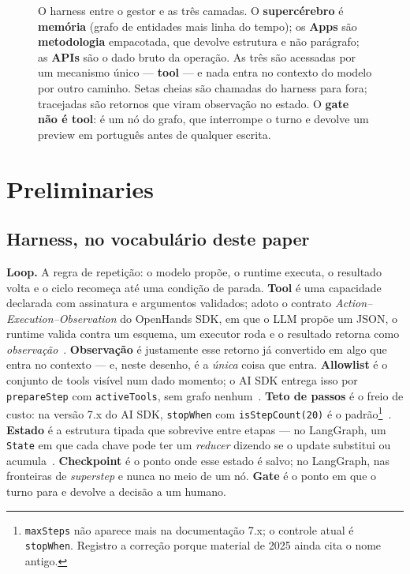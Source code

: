 \documentclass[10pt,twocolumn]{article}
\newcommand{\code}[1]{\texttt{\footnotesize #1}}
\begin{document}
\begin{figure}[t]
{}
\caption{O harness entre o gestor e as três camadas. O \textbf{supercérebro} é
\textbf{memória} (grafo de entidades mais linha do tempo); os \textbf{Apps} são
\textbf{metodologia} empacotada, que devolve estrutura e não parágrafo; as \textbf{APIs} são
o dado bruto da operação. As três são acessadas por um mecanismo único --- \textbf{tool} ---
e nada entra no contexto do modelo por outro caminho. Setas cheias são chamadas do harness
para fora; tracejadas são retornos que viram observação no estado. O \textbf{gate não é
tool}: é um nó do grafo, que interrompe o turno e devolve um preview em português antes de
qualquer escrita.}
\label{fig:sistema}
\end{figure}

\section{Preliminaries}

\subsection{Harness, no vocabulário deste paper}

\textbf{Loop.} A regra de repetição: o modelo propõe, o runtime executa, o resultado
volta e o ciclo recomeça até uma condição de parada. \textbf{Tool} é uma capacidade
declarada com assinatura e argumentos validados; adoto o contrato
\emph{Action--Execution--Observation} do OpenHands SDK, em que o LLM propõe um JSON, o
runtime valida contra um esquema, um executor roda e o resultado retorna como
\emph{observação}~\cite{wang2026openhands}. \textbf{Observação} é justamente esse retorno já
convertido em algo que entra no contexto --- e, neste desenho, é a \emph{única} coisa que
entra. \textbf{Allowlist} é o conjunto de tools visível num dado momento; o AI SDK entrega
isso por \code{prepareStep} com \code{activeTools}, sem grafo
nenhum~\cite{vercel2026loopcontrol}. \textbf{Teto de passos} é o freio de custo: na versão
7.x do AI SDK, \code{stopWhen} com \code{isStepCount(20)} é o
padrão\footnote{\code{maxSteps} não aparece mais na documentação 7.x; o controle atual é
\code{stopWhen}. Registro a correção porque material de 2025 ainda cita o nome
antigo.}~\cite{vercel2026loopcontrol}. \textbf{Estado} é a estrutura tipada que sobrevive
entre etapas --- no LangGraph, um \code{State} em que cada chave pode ter um \emph{reducer}
dizendo se o update substitui ou acumula~\cite{langchain2026langgraph}. \textbf{Checkpoint}
é o ponto onde esse estado é salvo; no LangGraph, nas fronteiras de \emph{superstep} e
nunca no meio de um nó. \textbf{Gate} é o ponto em que o turno para e devolve a decisão a um
humano.
\end{document}
